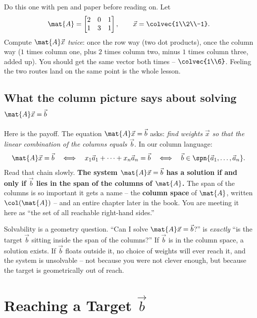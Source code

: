 \begin{labbox}
Do this one with pen and paper before reading on. Let
\[
  \mat{A} = \begin{bmatrix} 2 & 0 & 1 \\ 1 & 3 & 1 \end{bmatrix}, \qquad \vec{x} = \colvec{1\\2\\-1}.
\]
Compute $\mat{A}\vec{x}$ \emph{twice}: once the row way (two dot products), once the column way ($1$ times column one, plus $2$ times column two, minus $1$ times column three, added up). You should get the same vector both times -- $\colvec{1\\6}$. Feeling the two routes land on the same point is the whole lesson.
\end{labbox}

\subsection{What the column picture says about solving $\mat{A}\vec{x} = \vec{b}$}

Here is the payoff. The equation $\mat{A}\vec{x} = \vec{b}$ asks: \emph{find weights $\vec{x}$ so that the linear combination of the columns equals $\vec{b}$}. In our column language:
\[
  \mat{A}\vec{x} = \vec{b}
  \quad\Longleftrightarrow\quad
  x_1\vec{a}_1 + \cdots + x_n\vec{a}_n = \vec{b}
  \quad\Longleftrightarrow\quad
  \vec{b} \in \spn\{\vec{a}_1,\dots,\vec{a}_n\}.
\]
Read that chain slowly. \textbf{The system $\mat{A}\vec{x}=\vec{b}$ has a solution if and only if $\vec{b}$ lies in the span of the columns of $\mat{A}$.} The span of the columns is so important it gets a name -- the \textbf{column space} of $\mat{A}$, written $\col(\mat{A})$ -- and an entire chapter later in the book. You are meeting it here as ``the set of all reachable right-hand sides.''

\begin{focusbox}
Solvability is a geometry question. ``Can I solve $\mat{A}\vec{x}=\vec{b}$?'' is \emph{exactly} ``is the target $\vec{b}$ sitting inside the span of the columns?'' If $\vec{b}$ is in the column space, a solution exists. If $\vec{b}$ floats outside it, no choice of weights will ever reach it, and the system is unsolvable -- not because you were not clever enough, but because the target is geometrically out of reach.
\end{focusbox}

\section{Reaching a Target $\vec{b}$}

